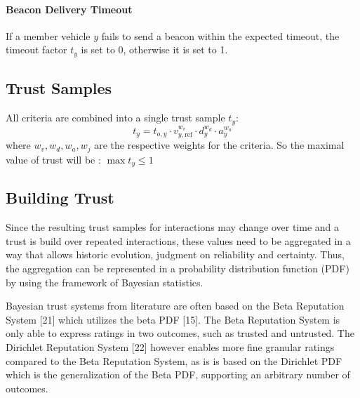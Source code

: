 \documentclass[letterpaper, 10pt, conference]{ieeeconf}  %
\begin{document}

\paragraph{Beacon Delivery Timeout} If a member vehicle $y$ fails to send a beacon within the expected timeout, the timeout factor $t_y$ is set to 0, otherwise it is set to 1.

\subsection{Trust Samples}

All criteria are combined into a single trust sample $t_y$:
\begin{equation}
    t_y = t_{o,y} \cdot v^{w_v}_{y,\text{ref}} \cdot d^{w_d}_y \cdot a^{w_a}_y 
\end{equation}
where $w_v, w_d, w_a, w_j$ are the respective weights for the criteria. So the maximal value of trust will be : 
$\max{t_y} \leq 1$

\subsection{Building Trust}
Since the resulting trust samples for interactions may change over time and a trust is build over repeated interactions, these values need to be aggregated in a way that allows historic evolution, judgment on reliability and
certainty. Thus, the aggregation can be represented in a probability distribution function (PDF) by using the framework
of Bayesian statistics.


Bayesian trust systems from literature are often based on the Beta Reputation System [21] which utilizes the beta PDF [15]. The Beta Reputation System is only able to express ratings in two outcomes, such as trusted and untrusted. The Dirichlet Reputation System [22] however
enables more fine granular ratings compared to the Beta Reputation System, as is is based on the Dirichlet PDF which is the generalization of the Beta PDF, supporting an arbitrary number of outcomes.
\end{document}
